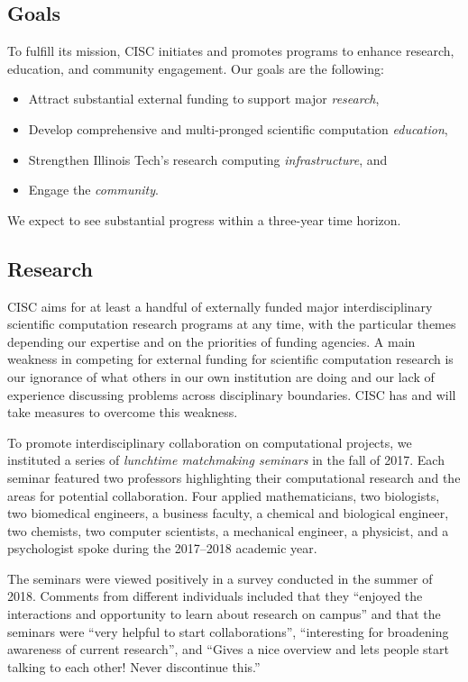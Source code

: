 \documentclass[12pt]{amsart}
\begin{document}
\subsection*{Goals}
To fulfill its mission, CISC initiates and promotes programs to enhance research, education, and community engagement.  Our goals are the following:
\begin{itemize}
    \item Attract substantial external funding to support major \emph{research},
    
    \item Develop comprehensive and multi-pronged scientific computation \emph{education},

    \item Strengthen Illinois Tech's research computing \emph{infrastructure}, and
    
    \item Engage the \emph{community}.
    
\end{itemize}
We expect to see substantial progress within a three-year time horizon.

\subsection*{Research} CISC aims for at least a handful of externally funded major interdisciplinary scientific computation research programs at any time, with the particular themes depending our expertise and on the priorities of funding agencies.  A main weakness in competing for external funding for scientific computation research is our ignorance of what others in our own institution are doing and our lack of experience discussing problems across disciplinary boundaries.  CISC has and will take measures to overcome this weakness.

To promote interdisciplinary collaboration on computational projects, we instituted a series of \emph{lunchtime matchmaking seminars} in the fall of 2017.  Each seminar featured two professors highlighting their computational research and the areas for potential collaboration.  Four applied mathematicians, two biologists, two biomedical engineers, a business faculty, a chemical and biological engineer, two chemists, two computer scientists,  a mechanical engineer, a physicist, and a psychologist spoke during the 2017--2018 academic year. 

The seminars were viewed positively in a survey conducted in the summer of 2018. Comments from different individuals included that they ``enjoyed the interactions and opportunity to learn about research on campus'' and that the seminars were ``very helpful to start collaborations'', ``interesting for broadening awareness of current research'', and ``Gives a nice overview and lets people start talking to each other! Never discontinue this.''
\end{document}
